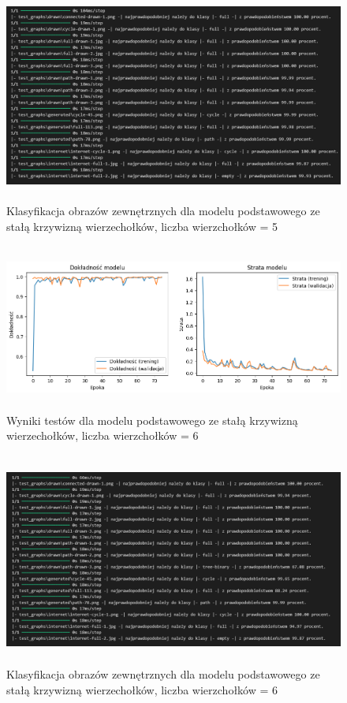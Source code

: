 \begin{figure}[ht]
	\centering
	\includegraphics[height=7cm]{resources/tests/images/v2/base5_txt.png}
	\caption{Klasyfikacja obrazów zewnętrznych dla modelu podstawowego ze stałą krzywizną wierzechołków, liczba wierzchołków = 5}
	\label{Fig:tests-base-2}
\end{figure}
\FloatBarrier

\begin{figure}[ht]
	\centering
	\includegraphics[height=5.5cm]{resources/tests/images/v2/base6_img.png}
	\caption{Wyniki testów dla modelu podstawowego ze stałą krzywizną wierzechołków, liczba wierzchołków = 6}
	\label{Fig:tests-base-1}
\end{figure}
\FloatBarrier

\begin{figure}[ht]
	\centering
	\includegraphics[height=7cm]{resources/tests/images/v2/base6_txt.png}
	\caption{Klasyfikacja obrazów zewnętrznych dla modelu podstawowego ze stałą krzywizną wierzechołków, liczba wierzchołków = 6}
	\label{Fig:tests-base-2}
\end{figure}
\FloatBarrier

